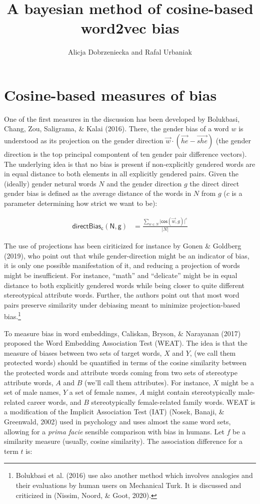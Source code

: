 \documentclass[10pt,dvipsnames,enabledeprecatedfontcommands]{scrartcl}
\title{A bayesian method of cosine-based word2vec bias}
\author{Alicja Dobrzeniecka and Rafal Urbaniak}
\date{}
\begin{document}
\maketitle

\section{Cosine-based measures of
bias}\label{cosine-based-measures-of-bias}

One of the first measures in the discussion has been developed by
Bolukbasi, Chang, Zou, Saligrama, \& Kalai (2016). There, the gender
bias of a word \(w\) is understood as its projection on the gender
direction \(\vec{w} \cdot (\overrightarrow{he} - \overrightarrow{she})\)
(the gender direction is the top principal compontent of ten gender pair
difference vectors). The underlying idea is that no bias is present if
non-explicitly gendered words are in equal distance to both elements in
all explicitly gendered pairs. Given the (ideally) gender netural words
\(N\) and the gender direction \(g\) the direct direct gender bias is
defined as the average distance of the words in \(N\) from \(g\) (\(c\)
is a parameter determining how strict we want to be):

\begin{align}
\mathsf{directBias_c(N,g)} & = \frac{\sum_{w\in N}\vert \mathsf{cos}(\vec{w},g)\vert^c}{\vert N \vert }
\end{align}

The use of projections has been ciriticized for instance by Gonen \&
Goldberg (2019), who point out that while gender-direction might be an
indicator of bias, it is only one possible manifestation of it, and
reducing a projection of words might be insufficient. For instance,
``math'' and ``delicate'' might be in equal distance to both explicitly
gendered words while being closer to quite different stereotypical
attribute words. Further, the authors point out that most word pairs
preserve similarity under debiasing meant to minimize projection-based
bias.\footnote{Bolukbasi et al. (2016) use also another method which
  involves analogies and their evaluations by human users on Mechanical
  Turk. It is discussed and criticized in (Nissim, Noord, \& Goot,
  2020).}

To measure bias in word embeddings, Caliskan, Bryson, \& Narayanan
(2017) proposed the Word Embedding Association Test (WEAT). The idea is
that the measure of biases between two sets of target words, \(X\) and
\(Y\), (we call them protected words) should be quantified in terms of
the cosine similarity between the protected words and attribute words
coming from two sets of stereotype attribute words, \(A\) and \(B\)
(we'll call them attributes). For instance, \(X\) might be a set of male
names, \(Y\) a set of female names, \(A\) might contain stereotypically
male-related career words, and \(B\) stereotypically female-related
family words. WEAT is a modification of the Implicit Association Test
(IAT) (Nosek, Banaji, \& Greenwald, 2002) used in psychology and uses
almost the same word sets, allowing for a \emph{prima facie} sensible
comparison with bias in humans. Let \(f\) be a similarity measure
(usually, cosine similarity). The association difference for a term
\(t\) is:
\end{document}
